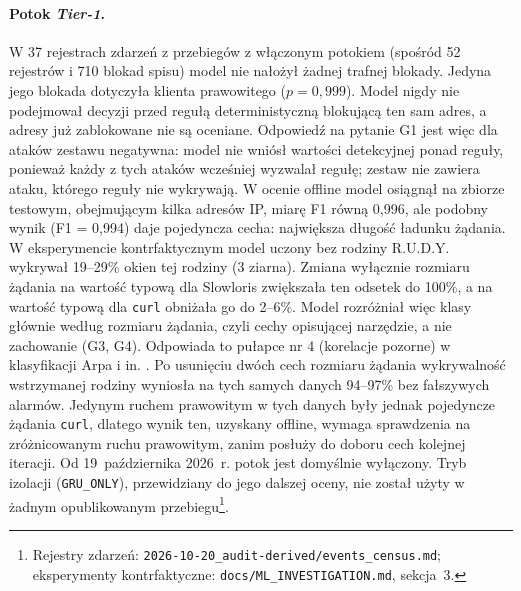 \documentclass[a4paper,12pt]{article}
\begin{document}
\paragraph{Potok \textit{Tier-1}.} W 37 rejestrach zdarzeń z przebiegów z włączonym potokiem (spośród 52 rejestrów i 710 blokad spisu) model nie nałożył żadnej trafnej blokady. Jedyna jego blokada dotyczyła klienta prawowitego ($p = 0{,}999$). Model nigdy nie podejmował decyzji przed regułą deterministyczną blokującą ten sam adres, a adresy już zablokowane nie są oceniane. Odpowiedź na pytanie G1 jest więc dla ataków zestawu negatywna: model nie wniósł wartości detekcyjnej ponad reguły, ponieważ każdy z tych ataków wcześniej wyzwalał regułę; zestaw nie zawiera ataku, którego reguły nie wykrywają. W ocenie offline model osiągnął na zbiorze testowym, obejmującym kilka adresów IP, miarę F1 równą 0,996, ale podobny wynik (F1 = 0,994) daje pojedyncza cecha: największa długość ładunku żądania. W eksperymencie kontrfaktycznym model uczony bez rodziny R.U.D.Y. wykrywał 19--29\% okien tej rodziny (3 ziarna). Zmiana wyłącznie rozmiaru żądania na wartość typową dla Slowloris zwiększała ten odsetek do 100\%, a na wartość typową dla \texttt{curl} obniżała go do 2--6\%. Model rozróżniał więc klasy głównie według rozmiaru żądania, czyli cechy opisującej narzędzie, a nie zachowanie (G3, G4). Odpowiada to pułapce nr 4 (korelacje pozorne) w klasyfikacji Arpa i in. \cite{arp2022dos}. Po usunięciu dwóch cech rozmiaru żądania wykrywalność wstrzymanej rodziny wyniosła na tych samych danych 94--97\% bez fałszywych alarmów. Jedynym ruchem prawowitym w tych danych były jednak pojedyncze żądania \texttt{curl}, dlatego wynik ten, uzyskany offline, wymaga sprawdzenia na zróżnicowanym ruchu prawowitym, zanim posłuży do doboru cech kolejnej iteracji. Od 19~października 2026~r. potok jest domyślnie wyłączony. Tryb izolacji (\texttt{GRU\_ONLY}), przewidziany do jego dalszej oceny, nie został użyty w żadnym opublikowanym przebiegu\footnote{\raggedright Rejestry zdarzeń: \texttt{2026-10-20\_audit-derived/events\_census.md}; eksperymenty kontrfaktyczne: \texttt{docs/ML\_INVESTIGATION.md}, sekcja~3.}.
\end{document}
